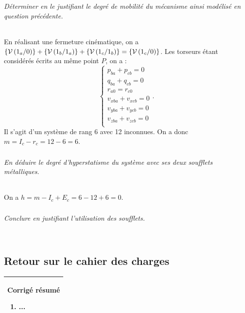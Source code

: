 \documentclass[10pt,fleqn]{article} %
\begin{document}
\begin{multicols}{2}
\subparagraph{}\textit{Déterminer en le justifiant le degré de mobilité du mécanisme ainsi modélisé en question précédente.}
\ifprof
\begin{corrige} ~\\
En réalisant une fermeture cinématique, on a $\left\{\mathcal{V} \left(1_a/0 \right) \right\}+\left\{\mathcal{V} \left(1_b/1_a \right) \right\}+\left\{\mathcal{V} \left(1_c/1_b \right) \right\}=\left\{\mathcal{V} \left(1_c/0 \right) \right\}$. 
Les torseurs étant considérés écrits au même point $P$, on a : 
$$
\left\{ 
\begin{array}{l}
p_{ba}+p_{cb}=0 \\
q_{ba}+q_{cb}=0 \\
r_{a0}=r_{c0}\\
v_{xba} + v_{xcb}=0\\
v_{yba} + v_{ycb}=0\\
v_{zba} + v_{zcb}=0\\
\end{array}
\right. .
$$
Il s'agit d'un système de rang 6 avec 12 inconnues. On a donc $m=I_c-r_c=12-6=6$.
\end{corrige}
\else
\fi


\subparagraph{}\textit{En déduire le degré d’hyperstatisme du système avec ses deux soufflets métalliques.}
\ifprof
\begin{corrige} ~\\
On a $h=m-I_c+E_c = 6-12+6 = 0$.
\end{corrige}
\else
\fi


\subparagraph{}\textit{Conclure en justifiant l’utilisation des soufflets.}
\ifprof
\begin{corrige} ~\\
\end{corrige}
\else
\fi


\subsection*{Retour sur le cahier des charges}


\ifprof
\else
\begin{center}
\begin{tabular}{|p{.95\linewidth}|}
\hline
\textbf{Corrigé résumé}
\begin{enumerate}
\item ...
\end{enumerate} \\
\hline
\end{tabular}
\end{center}
\fi

\end{multicols}
\end{document}
